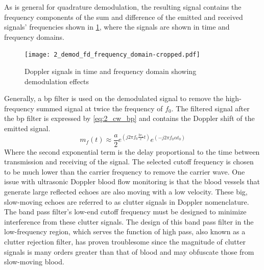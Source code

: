 As is general for quadrature demodulation, the resulting signal contains the frequency components of the sum and difference of the emitted and received signals' frequencies shown in \cref{fig:2_demod_fd_frequency_domain}, where the signals are shown in time and frequency domains. 

\begin{figure}[ht]
	\centering
	\texttt{[image: 2\_demod\_fd\_frequency\_domain-cropped.pdf]}
	\caption[Doppler signals in time and frequency domain showing demodulation effects]{Doppler signals in time and frequency domain showing demodulation effects \cite{ShungUltrasound_Book}}
	\label{fig:2_demod_fd_frequency_domain}
\end{figure}

Generally, a \gls{bp} filter is used on the demodulated signal to remove the high-frequency summed signal at twice the frequency of $f_{0}$. The filtered signal after the \gls{bp} filter is expressed by \cref{eq:2_cw_bp} and contains the Doppler shift of the emitted signal.
\begin{equation} \label{eq:2_cw_bp}
	m_{f}(t) \approx \frac{a}{2} e^{\left(j2\pi f_{0} \frac{2v_{z}}{c}t\right)} e^{\left( -j2\pi f_{0} \alpha t_{0} \right)}
\end{equation}
Where the second exponential term is the delay proportional to the time between transmission and receiving of the signal. The selected cutoff frequency is chosen to be much lower than the carrier frequency to remove the carrier wave. One issue with ultrasonic Doppler blood flow monitoring is that the blood vessels that generate large reflected echoes are also moving with a low velocity. These big, slow-moving echoes are referred to as clutter signals in Doppler nomenclature. The band pass filter's low-end cutoff frequency must be designed to minimize interference from these clutter signals. The design of this band pass filter in the low-frequency region, which serves the function of high pass, also known as a clutter rejection filter, has proven troublesome since the magnitude of clutter signals is many orders greater than that of blood and may obfuscate those from slow-moving blood. 


